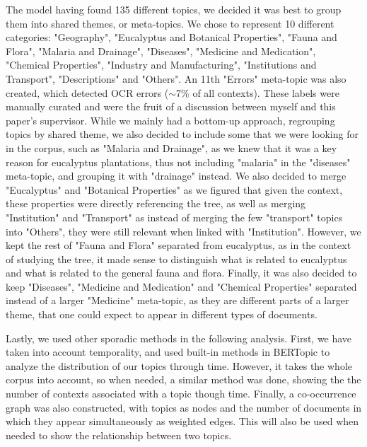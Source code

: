 The model having found 135 different topics, we decided it was best to group them into shared themes, or meta-topics. We chose to represent 10 different categories: "Geography", "Eucalyptus and Botanical Properties", "Fauna and Flora", "Malaria and Drainage", "Diseases", "Medicine and Medication", "Chemical Properties", "Industry and Manufacturing", "Institutions and Transport", "Descriptions" and "Others". An 11th "Errors" meta-topic was also created, which detected OCR errors ($\sim$7\% of all contexts). These labels were manually curated and were the fruit of a discussion between myself and this paper's supervisor. While we mainly had a bottom-up approach, regrouping topics by shared theme, we also decided to include some that we were looking for in the corpus, such as "Malaria and Drainage", as we knew that it was a key reason for eucalyptus plantations, thus not including "malaria" in the "diseases" meta-topic, and grouping it with "drainage" instead. We also decided to merge "Eucalyptus" and "Botanical Properties" as we figured that given the context, these properties were directly referencing the tree, as well as merging "Institution" and "Transport" as instead of merging the few "transport" topics into "Others", they were still relevant when linked with "Institution". However, we kept the rest of "Fauna and Flora" separated from eucalyptus, as in the context of studying the tree, it made sense to distinguish what is related to eucalyptus and what is related to the general fauna and flora. Finally, it was also decided to keep "Diseases", "Medicine and Medication" and "Chemical Properties" separated instead of a larger "Medicine" meta-topic, as they are different parts of a larger theme, that one could expect to appear in different types of documents.

Lastly, we used other sporadic methods in the following analysis. First, we have taken into account temporality, and used built-in methods in BERTopic to analyze the distribution of our topics through time. However, it takes the whole corpus into account, so when needed, a similar method was done, showing the the number of contexts associated with a topic though time. Finally, a co-occurrence graph was also constructed, with topics as nodes and the number of documents in which they appear simultaneously as weighted edges. This will also be used when needed to show the relationship between two topics.
